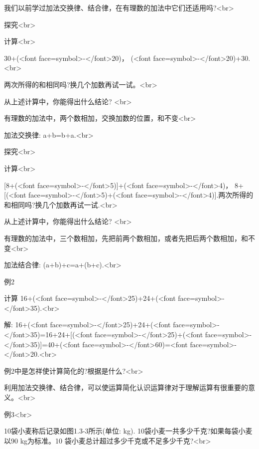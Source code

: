     
\endexercise

    我们以前学过加法交换律、结合律，在有理数的加法中它们还适用吗?<br>

    
    探究<br>

    
    计算<br>

    
    30+(<font face=symbol>-</font>20)， (<font face=symbol>-</font>20)+30.<br>

    
    两次所得的和相同吗?换几个加数再试一试。<br>

    
    
    从上述计算中，你能得出什么结论? <br>

    
\beginproperty
    
有理数的加法中，两个数相加，交换加数的位置，和不变<br>


加法交换律: a+b=b+a.<br>


\endproperty
    
    探究<br>

    
    计算<br>


[8+(<font face=symbol>-</font>5)]+(<font face=symbol>-</font>4)， 8+[(<font face=symbol>-</font>5)+(<font face=symbol>-</font>4)].两次所得的和相同吗?换几个加数再试一试.<br>


从上述计算中，你能得出什么结论? <br>


\beginproperty
    
有理数的加法中，三个数相加，先把前两个数相加，或者先把后两个数相加，和不变<br>

加法结合律: (a+b)+c=a+(b+c).<br>


\endproperty

\beginexample
    
    例2
    
    计算 16+(<font face=symbol>-</font>25)+24+(<font face=symbol>-</font>35).<br>

    
    解: 16+(<font face=symbol>-</font>25)+24+(<font face=symbol>-</font>35)=16+24+[(<font face=symbol>-</font>25)+(<font face=symbol>-</font>35)]=40+(<font face=symbol>-</font>60)=<font face=symbol>-</font>20.<br>

    
    例2中是怎祥使计算简化的?根据是什么?<br>

    
    利用加法交换律、结合律，可以使运算简化认识运算律对于理解运算有很重要的意义。<br>

    
    例3<br>

    
    10袋小麦称后记录如图1.3-3所示(单位: kg). 10袋小麦一共多少千克?如果每袋小麦以90 kg为标准。10 袋小麦总计超过多少千克或不足多少千克?<br>

